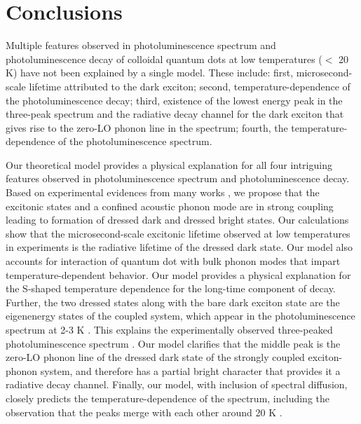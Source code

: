 \documentclass[aps,pra,preprint,groupedaddress]{revtex4-1}
\begin{document}
\section*{Conclusions}
Multiple features observed in photoluminescence spectrum and photoluminescence decay of colloidal quantum dots at low temperatures ($<$ 20 K) have not been explained by a single model. These include: first, microsecond-scale lifetime attributed to the dark exciton; second, temperature-dependence of the photoluminescence decay; third, existence of the lowest energy peak in the three-peak spectrum and the radiative decay channel for the dark exciton that gives rise to the zero-LO phonon line in the spectrum; fourth, the temperature-dependence of the photoluminescence spectrum.

Our theoretical model provides a physical explanation for all four intriguing features observed in photoluminescence spectrum and photoluminescence decay. Based on experimental evidences from many works \cite{Saviot1996,Woggon1996, Sagar2008, Oron2009, Chilla2008,GranadosDelAguila2014,Werschler2016}, we propose that the excitonic states and a confined acoustic phonon mode are in strong coupling leading to formation of dressed dark and dressed bright states. Our calculations show that the microsecond-scale excitonic lifetime observed at low temperatures in experiments is the radiative lifetime of the dressed dark state. Our model also accounts for interaction of quantum dot with bulk phonon modes that impart temperature-dependent behavior. Our model provides a physical explanation for the S-shaped temperature dependence for the long-time component of decay. Further, the two dressed states along with the bare dark exciton state are the eigenenergy states of the coupled system, which appear in the photoluminescence spectrum at 2-3 K \cite{Biadala2009}. This explains the experimentally observed three-peaked photoluminescence spectrum \cite{Biadala2009}. Our model clarifies that the middle peak is the zero-LO phonon line of the dressed dark state of the strongly coupled exciton-phonon system, and therefore has a partial bright character that provides it a radiative decay channel. Finally, our model, with inclusion of spectral diffusion, closely predicts the temperature-dependence of the spectrum, including the observation that the peaks merge with each other around 20 K \cite{Biadala2009}.
\end{document}
